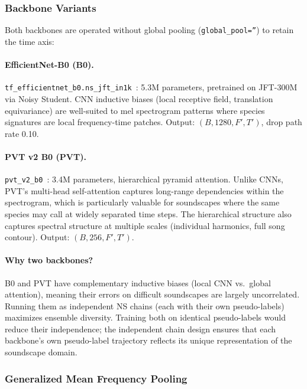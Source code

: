 \documentclass[journal]{IEEEtran}
\begin{document}
\subsubsection{Backbone Variants}

Both backbones are operated without global pooling (\texttt{global\_pool=''}) to retain the time axis:

\paragraph{EfficientNet-B0 (B0).}
\texttt{tf\_efficientnet\_b0.ns\_jft\_in1k}~\cite{tan2019efficientnet}: 5.3M parameters, pretrained on JFT-300M via Noisy Student.
CNN inductive biases (local receptive field, translation equivariance) are well-suited to mel spectrogram patterns where species signatures are local frequency-time patches.
Output: $(B, 1280, F', T')$, drop path rate 0.10.

\paragraph{PVT v2 B0 (PVT).}
\texttt{pvt\_v2\_b0}~\cite{wang2022pvt}: 3.4M parameters, hierarchical pyramid attention.
Unlike CNNs, PVT's multi-head self-attention captures long-range dependencies within the spectrogram, which is particularly valuable for soundscapes where the same species may call at widely separated time steps.
The hierarchical structure also captures spectral structure at multiple scales (individual harmonics, full song contour).
Output: $(B, 256, F', T')$.

\paragraph{Why two backbones?}
B0 and PVT have complementary inductive biases (local CNN vs.\ global attention), meaning their errors on difficult soundscapes are largely uncorrelated.
Running them as independent NS chains (each with their own pseudo-labels) maximizes ensemble diversity.
Training both on identical pseudo-labels would reduce their independence; the independent chain design ensures that each backbone's own pseudo-label trajectory reflects its unique representation of the soundscape domain.

\subsubsection{Generalized Mean Frequency Pooling}
\end{document}
